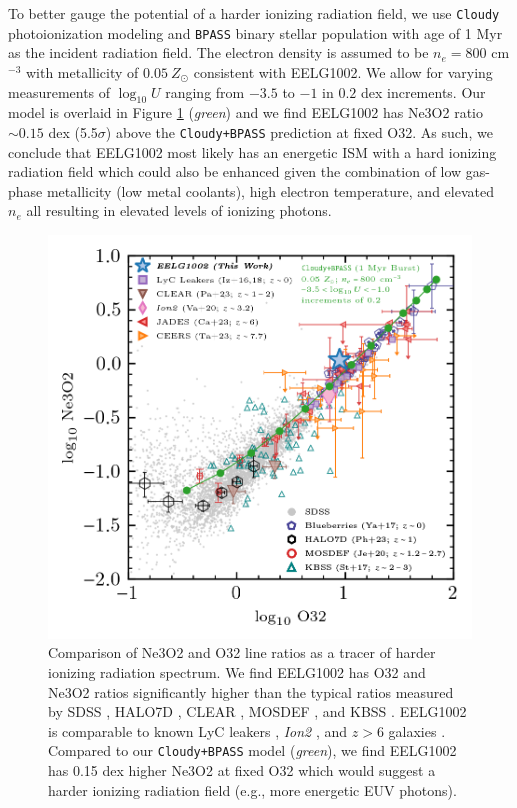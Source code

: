 \documentclass[twocolumn,tight,times,linenumbers]{aastex631}
\begin{document}
		To better gauge the potential of a harder ionizing radiation field, we use \texttt{Cloudy} photoionization modeling and \texttt{BPASS} binary stellar population with age of 1 Myr as the incident radiation field. The electron density is assumed to be $n_e = 800$ cm$^{-3}$ with metallicity of $0.05~Z_\odot$ consistent with EELG1002. We allow for varying measurements of $\log_{10} U$ ranging from $-3.5$ to $-1$ in $0.2$ dex increments. Our model is overlaid in Figure \ref{fig:Ne3O2} (\textit{green}) and we find EELG1002 has Ne3O2 ratio $\sim 0.15$ dex (5.5$\sigma$) above the \texttt{Cloudy+BPASS} prediction at fixed O32. As such, we conclude that EELG1002 most likely has an energetic ISM with a hard ionizing radiation field which could also be enhanced given the combination of low gas-phase metallicity (low metal coolants), high electron temperature, and elevated $n_e$ all resulting in elevated levels of ionizing photons.

		\begin{figure}
			\centering
			\includegraphics[width=\columnwidth]{figures/Ne3O2_O32.png}
			\caption{Comparison of Ne3O2 and O32 line ratios as a tracer of harder ionizing radiation spectrum. We find EELG1002 has O32 and Ne3O2 ratios significantly higher than the typical ratios measured by SDSS \citep{Thomas2013}, HALO7D \citep{Pharo2023}, CLEAR \citep{Papovich2023}, MOSDEF \citep{Jeong2020}, and KBSS \citep{Strom2017}. EELG1002 is comparable to known LyC leakers \citep{Izotov2016,Izotov2018},  \textit{Ion2} \citep{Vanzella2020}, and $z>6$ galaxies \citep{Cameron2023,Tang2023}. Compared to our \texttt{Cloudy+BPASS} model (\textit{green}), we find EELG1002 has 0.15 dex higher Ne3O2 at fixed O32 which would suggest a harder ionizing radiation field (e.g., more energetic EUV photons).}
			\label{fig:Ne3O2}
		\end{figure}
			
\end{document}
